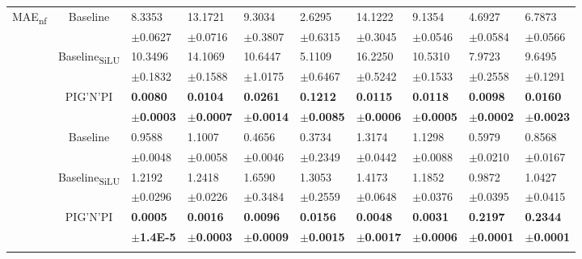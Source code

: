 \documentclass{article}
\newcommand{\pignpi}{PIG'N'PI\xspace}
\begin{document}
\begin{table}[h!]
{\begin{tabularx}{\textwidth}{ccXXXXXXXX}
        \multirow{6}{*}{\textsf{MAE\textsubscript{nf}}}
        &\multirow{2}{*}{Baseline}
        & 8.3353 & 13.1721 & 9.3034 & 2.6295 & 14.1222 & 9.1354 & 4.6927 & 6.7873 \\
        &&\scriptsize$\pm$0.0627 & \scriptsize $\pm$0.0716 & \scriptsize $\pm$0.3807 & \scriptsize $\pm$0.6315 & \scriptsize $\pm$0.3045 & \scriptsize $\pm$0.0546 & \scriptsize $\pm$0.0584 & \scriptsize $\pm$0.0566\\
        \cline{3-10}\rule{0pt}{2.3ex}
        &\multirow{2}{*}{{Baseline\textsubscript{SiLU}}}
        & 10.3496 & 14.1069 & 10.6447 & 5.1109 & 16.2250 & 10.5310 & 7.9723 & 9.6495 \\
        &&\scriptsize$\pm$0.1832 & \scriptsize $\pm$0.1588 & \scriptsize $\pm$1.0175 & \scriptsize $\pm$0.6467 & \scriptsize $\pm$0.5242 & \scriptsize $\pm$0.1533 & \scriptsize $\pm$0.2558 & \scriptsize $\pm$0.1291\\
        \cline{3-10}\rule{0pt}{2.3ex}
        &\multirow{2}{*}{\pignpi}
        & \textbf{0.0080} & \textbf{0.0104} & \textbf{0.0261} & \textbf{0.1212} & \textbf{0.0115} & \textbf{0.0118} & \textbf{0.0098} & \textbf{0.0160} \\
        && \scriptsize \textbf{$\pm$0.0003} & \scriptsize \textbf{$\pm$0.0007} & \scriptsize \textbf{$\pm$0.0014} & \scriptsize \textbf{$\pm$0.0085} & \scriptsize \textbf{$\pm$0.0006} & \scriptsize \textbf{$\pm$0.0005} & \scriptsize \textbf{$\pm$0.0002} & \scriptsize \textbf{$\pm$0.0023}\\
        \hline\rule{0pt}{2.3ex}
        
        \multirow{6}{*}{\textsf{MAE\textsubscript{$\Delta$ep}}}
        &\multirow{2}{*}{Baseline}
        & 0.9588 & 1.1007 & 0.4656 & 0.3734 & 1.3174 & 1.1298 & 0.5979 & 0.8568 \\
        &&\scriptsize$\pm$0.0048 & \scriptsize $\pm$0.0058 & \scriptsize $\pm$0.0046 & \scriptsize $\pm$0.2349 & \scriptsize $\pm$0.0442 & \scriptsize $\pm$0.0088 & \scriptsize $\pm$0.0210 & \scriptsize $\pm$0.0167 \\
        \cline{3-10}\rule{0pt}{2.3ex}
        &\multirow{2}{*}{{Baseline\textsubscript{SiLU}}}
        & 1.2192 & 1.2418 & 1.6590 & 1.3053 & 1.4173 & 1.1852 & 0.9872 & 1.0427 \\
        &&\scriptsize$\pm$0.0296 & \scriptsize $\pm$0.0226 & \scriptsize $\pm$0.3484 & \scriptsize $\pm$0.2559 & \scriptsize $\pm$0.0648 & \scriptsize $\pm$0.0376 & \scriptsize $\pm$0.0395 & \scriptsize $\pm$0.0415 \\
        \cline{3-10}\rule{0pt}{2.3ex}
        &\multirow{2}{*}{\pignpi}
        & \textbf{0.0005} & \textbf{0.0016} & \textbf{0.0096} & \textbf{0.0156} & \textbf{0.0048} & \textbf{0.0031} & \textbf{0.2197} & \textbf{0.2344} \\
        && \tiny \textbf{$\pm$1.4E-5} & \scriptsize \textbf{$\pm$0.0003} & \scriptsize \textbf{$\pm$0.0009} & \scriptsize \textbf{$\pm$0.0015} & \scriptsize \textbf{$\pm$0.0017} & \scriptsize \textbf{$\pm$0.0006} & \scriptsize \textbf{$\pm$0.0001} & \scriptsize \textbf{$\pm$0.0001}\\
        \hline\rule{0pt}{2.3ex}
        

\end{tabularx}}
\end{table}
\end{document}
